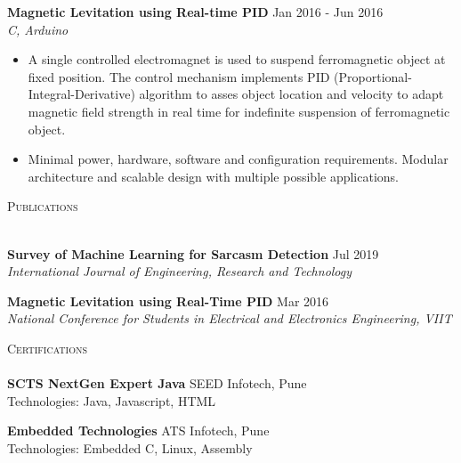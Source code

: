 \documentclass[a4paper]{article}
\newcommand{\lineunder} {
    \vspace*{-8pt} \\
    \hspace*{-18pt} \hrulefill \\
}
\newcommand{\header} [1] {
    {\hspace*{-18pt}\vspace*{6pt} \textsc{#1}}
    \vspace*{-6pt} \lineunder
}
\begin{document}
{\textbf{Magnetic Levitation using Real-time PID}} \hfill Jan 2016 - Jun 2016\\
\textit{C, Arduino} \\
\begin{itemize}
    \item A single controlled electromagnet is used to suspend ferromagnetic object at fixed position. The control mechanism implements PID (Proportional-Integral-Derivative) algorithm to asses object location and velocity to adapt magnetic field strength in real time for indefinite suspension of ferromagnetic object.\\
  \item Minimal power, hardware, software and configuration requirements. Modular architecture and scalable design with multiple possible applications.
\end{itemize}
\vspace*{2mm}

\header{Publications}
\vspace{1mm}

{\textbf{Survey of Machine Learning for Sarcasm Detection}} \hfill Jul 2019\\
\textit{International Journal of Engineering, Research and Technology} \\
\vspace*{2mm}

{\textbf{Magnetic Levitation using Real-Time PID}} \hfill Mar 2016\\
\textit{National Conference for Students in Electrical and Electronics Engineering, VIIT} \\
\vspace*{2mm}

\header{Certifications}
\vspace{1mm}
\textbf{SCTS NextGen Expert Java} \hfill SEED Infotech, Pune\\
Technologies: Java, Javascript, HTML\\
\vspace*{2mm}

\textbf{Embedded Technologies} \hfill ATS Infotech, Pune\\
Technologies: Embedded C, Linux, Assembly\\
\vspace*{2mm}
\end{document}

